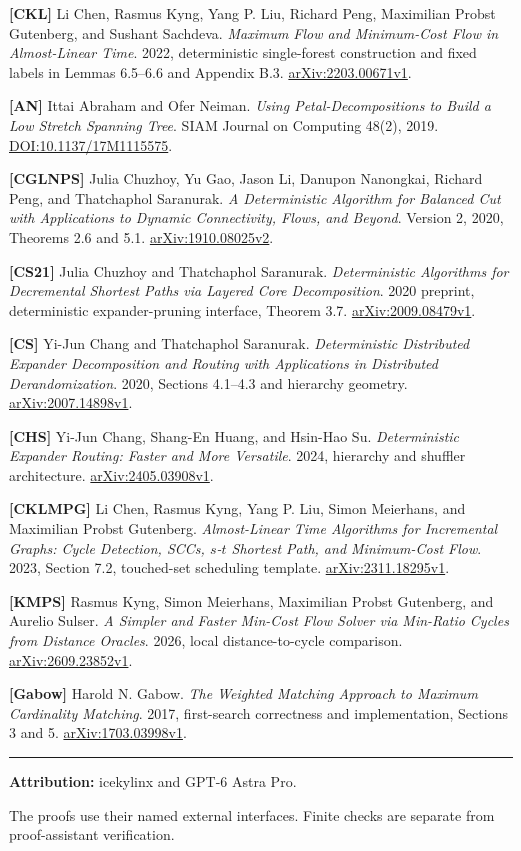 \textbf{{[}CKL{]}} Li Chen, Rasmus Kyng, Yang P. Liu, Richard Peng, Maximilian Probst Gutenberg, and Sushant Sachdeva. \emph{Maximum Flow and Minimum-Cost Flow in Almost-Linear Time}. 2022, deterministic single-forest construction and fixed labels in Lemmas 6.5--6.6 and Appendix B.3. \href{https://arxiv.org/abs/2203.00671v1}{arXiv:2203.00671v1}.

\textbf{{[}AN{]}} Ittai Abraham and Ofer Neiman. \emph{Using Petal-Decompositions to Build a Low Stretch Spanning Tree}. SIAM Journal on Computing 48(2), 2019. \href{https://doi.org/10.1137/17M1115575}{DOI:10.1137/17M1115575}.

\textbf{{[}CGLNPS{]}} Julia Chuzhoy, Yu Gao, Jason Li, Danupon Nanongkai, Richard Peng, and Thatchaphol Saranurak. \emph{A Deterministic Algorithm for Balanced Cut with Applications to Dynamic Connectivity, Flows, and Beyond}. Version 2, 2020, Theorems 2.6 and 5.1. \href{https://arxiv.org/abs/1910.08025v2}{arXiv:1910.08025v2}.

\textbf{{[}CS21{]}} Julia Chuzhoy and Thatchaphol Saranurak. \emph{Deterministic Algorithms for Decremental Shortest Paths via Layered Core Decomposition}. 2020 preprint, deterministic expander-pruning interface, Theorem 3.7. \href{https://arxiv.org/abs/2009.08479v1}{arXiv:2009.08479v1}.

\textbf{{[}CS{]}} Yi-Jun Chang and Thatchaphol Saranurak. \emph{Deterministic Distributed Expander Decomposition and Routing with Applications in Distributed Derandomization}. 2020, Sections 4.1--4.3 and hierarchy geometry. \href{https://arxiv.org/abs/2007.14898v1}{arXiv:2007.14898v1}.

\textbf{{[}CHS{]}} Yi-Jun Chang, Shang-En Huang, and Hsin-Hao Su. \emph{Deterministic Expander Routing: Faster and More Versatile}. 2024, hierarchy and shuffler architecture. \href{https://arxiv.org/abs/2405.03908v1}{arXiv:2405.03908v1}.

\textbf{{[}CKLMPG{]}} Li Chen, Rasmus Kyng, Yang P. Liu, Simon Meierhans, and Maximilian Probst Gutenberg. \emph{Almost-Linear Time Algorithms for Incremental Graphs: Cycle Detection, SCCs, \(s\)-\(t\) Shortest Path, and Minimum-Cost Flow}. 2023, Section 7.2, touched-set scheduling template. \href{https://arxiv.org/abs/2311.18295v1}{arXiv:2311.18295v1}.

\textbf{{[}KMPS{]}} Rasmus Kyng, Simon Meierhans, Maximilian Probst Gutenberg, and Aurelio Sulser. \emph{A Simpler and Faster Min-Cost Flow Solver via Min-Ratio Cycles from Distance Oracles}. 2026, local distance-to-cycle comparison. \href{https://arxiv.org/abs/2609.23852v1}{arXiv:2609.23852v1}.

\textbf{{[}Gabow{]}} Harold N. Gabow. \emph{The Weighted Matching Approach to Maximum Cardinality Matching}. 2017, first-search correctness and implementation, Sections 3 and 5. \href{https://arxiv.org/abs/1703.03998v1}{arXiv:1703.03998v1}.

\begin{center}\rule{0.5\linewidth}{0.5pt}\end{center}

\textbf{Attribution:} icekylinx and GPT-6 Astra Pro.

The proofs use their named external interfaces. Finite checks are separate from proof-assistant verification.
